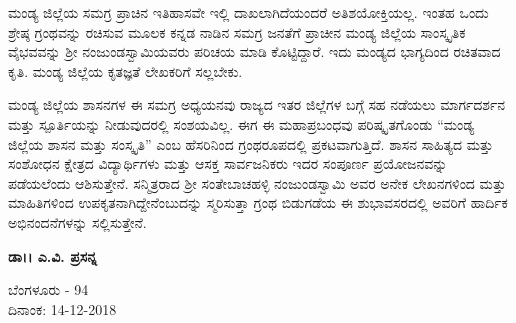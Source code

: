ಮಂಡ್ಯ ಜಿಲ್ಲೆಯ ಸಮಗ್ರ ಪ್ರಾಚಿನ ಇತಿಹಾಸವೇ ಇಲ್ಲಿ ದಾಖಲಾಗಿದೆಯಂದರೆ ಅತಿಶಯೋಕ್ತಿಯಲ್ಲ. ಇಂತಹ ಒಂದು ಶ್ರೇಷ್ಠ ಗ್ರಂಥವನ್ನು ರಚಿಸುವ ಮೂಲಕ ಕನ್ನಡ ನಾಡಿನ ಸಮಗ್ರ ಜನತೆಗೆ ಪ್ರಾಚೀನ ಮಂಡ್ಯ ಜಿಲ್ಲೆಯ ಸಾಂಸ್ಕೃತಿಕ ವೈಭವವನ್ನು ಶ‍್ರೀ ನಂಜುಂಡಸ್ವಾಮಿಯವರು ಪರಿಚಯ ಮಾಡಿ ಕೊಟ್ಟಿದ್ದಾರೆ. ಇದು ಮಂಡ್ಯದ ಭಾಗ್ಯದಿಂದ ರಚಿತವಾದ ಕೃತಿ. ಮಂಡ್ಯ ಜಿಲ್ಲೆಯ ಕೃತಜ್ಞತೆ ಲೇಖಕರಿಗೆ ಸಲ್ಲಬೇಕು.

ಮಂಡ್ಯ ಜಿಲ್ಲೆಯ ಶಾಸನಗಳ ಈ ಸಮಗ್ರ ಅಧ್ಯಯನವು ರಾಜ್ಯದ ಇತರ ಜಿಲ್ಲೆಗಳ ಬಗ್ಗೆ ಸಹ ನಡೆಯಲು ಮಾರ್ಗದರ್ಶನ ಮತ್ತು ಸ್ಪೂರ್ತಿಯನ್ನು ನೀಡುವುದರಲ್ಲಿ ಸಂಶಯವಿಲ್ಲ. ಈಗ ಈ ಮಹಾಪ್ರಬಂಧವು ಪರಿಷ್ಕೃತಗೊಂಡು “ಮಂಡ್ಯ ಜಿಲ್ಲೆಯ ಶಾಸನ ಮತ್ತು ಸಂಸ್ಕೃತಿ” ಎಂಬ ಹೆಸರಿನಿಂದ ಗ್ರಂಥರೂಪದಲ್ಲಿ ಪ್ರಕಟವಾಗುತ್ತಿದೆ. ಶಾಸನ ಸಾಹಿತ್ಯದ ಮತ್ತು ಸಂಶೋಧನ ಕ್ಷೇತ್ರದ ವಿದ್ಯಾರ್ಥಿಗಳು ಮತ್ತು ಆಸಕ್ತ ಸಾರ್ವಜನಿಕರು ಇದರ ಸಂಪೂರ್ಣ ಪ್ರಯೋಜನವನ್ನು ಪಡೆಯಲೆಂದು ಆಶಿಸುತ್ತೇನೆ. ಸನ್ಮಿತ್ರರಾದ ಶ‍್ರೀ ಸಂತೇಬಾಚಹಳ್ಳಿ ನಂಜುಂಡಸ್ವಾಮಿ ಅವರ ಅನೇಕ ಲೇಖನಗಳಿಂದ ಮತ್ತು ಮಾಹಿತಿಗಳಿಂದ ಉಪಕೃತನಾಗಿದ್ದೇನೆಂಬುದನ್ನು ಸ್ಮರಿಸುತ್ತಾ ಗ್ರಂಥ ಬಿಡುಗಡೆಯ ಈ ಶುಭಾವಸರದಲ್ಲಿ ಅವರಿಗೆ ಹಾರ್ದಿಕ ಅಭಿನಂದನೆಗಳನ್ನು ಸಲ್ಲಿಸುತ್ತೇನೆ.

\begin{flushright}
\textbf{ಡಾ।। ಎ.ವಿ. ಪ್ರಸನ್ನ}
\end{flushright}

\noindent
ಬೆಂಗಳೂರು - 94\\ ದಿನಾಂಕ: 14-12-2018


